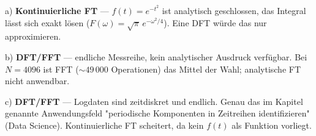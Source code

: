 \documentclass[11pt, a4paper]{article}
\begin{document}
a) \textbf{Kontinuierliche FT} — $f(t) = e^{-t^2}$ ist analytisch geschlossen, das Integral lässt sich exakt lösen ($F(\omega) = \sqrt{\pi}\,e^{-\omega^2/4}$). Eine DFT würde das nur approximieren.


b) \textbf{DFT/FFT} — endliche Messreihe, kein analytischer Ausdruck verfügbar. Bei $N = 4096$ ist FFT ($\sim 49\,000$ Operationen) das Mittel der Wahl; analytische FT nicht anwendbar.


c) \textbf{DFT/FFT} — Logdaten sind zeitdiskret und endlich. Genau das im Kapitel genannte Anwendungsfeld "periodische Komponenten in Zeitreihen identifizieren" (Data Science). Kontinuierliche FT scheitert, da kein $f(t)$ als Funktion vorliegt.





\end{document}
